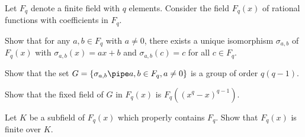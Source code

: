 Let $F_q$ denote a finite field with $q$ elements. Consider the field
$F_q(x)$ of rational functions with coefficients in $F_q$.
\begin{alist}
\item Show that for any $a,b\in F_q$ with $a\neq 0$, there exists a unique
isomorphism $\sigma_{a,b}$ of $F_q(x)$ with $\sigma_{a,b}(x)=ax+b$ and
$\sigma_{a,b}(c)=c$ for all $c\in F_q$.
\item Show that the set $G=\{\sigma_{a,b}\pipe a,b\in F_q, a\neq 0\}$
is a group of order $q(q-1)$.
\item Show that the fixed field of $G$ in $F_q(x)$ is
$F_q((x^q-x)^{q-1})$.
\item Let $K$ be a subfield of $F_q(x)$ which properly contains
$F_q$. Show that $F_q(x)$ is finite over $K$.
\end{alist}
